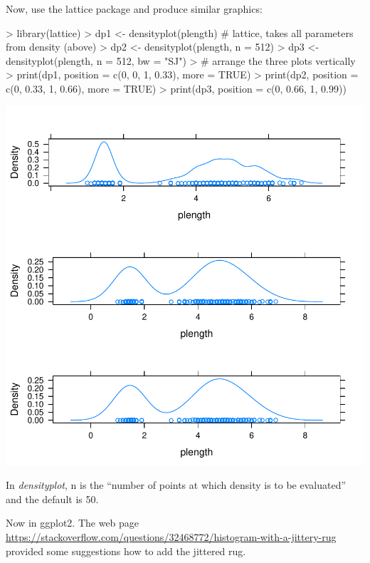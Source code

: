 Now, use the lattice package and produce similar graphics:
\begin{Schunk}
\begin{Sinput}
> library(lattice)
> dp1 <- densityplot(plength)  # lattice, takes all parameters from density (above)
> dp2 <- densityplot(plength, n = 512)
> dp3 <- densityplot(plength, n = 512, bw = "SJ")
> # arrange the three plots vertically
> print(dp1, position = c(0, 0, 1, 0.33), more = TRUE)
> print(dp2, position = c(0, 0.33, 1, 0.66), more = TRUE)
> print(dp3, position = c(0, 0.66, 1, 0.99))
\end{Sinput}
\end{Schunk}
\includegraphics{lect_chapter5_v2-029}

In {\it densityplot}, n is the ``number of points at which density is to be evaluated''
and the default is 50.


Now in ggplot2. The web page 
\url{https://stackoverflow.com/questions/32468772/histogram-with-a-jittery-rug}
provided some suggestions how to add the jittered rug.


